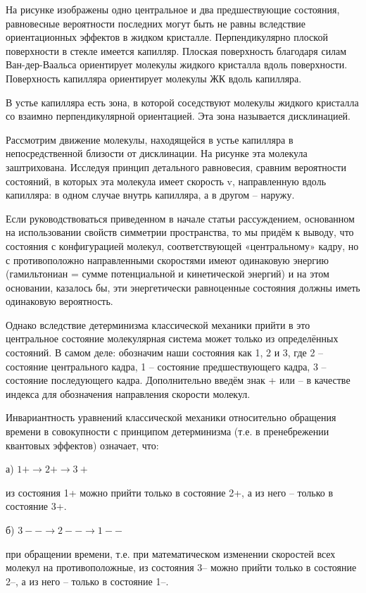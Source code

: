 \documentclass[11pt]{article}
\begin{document}
    На рисунке изображены одно центральное и два предшествующие состояния,
равновесные вероятности последних могут быть не равны вследствие
ориентационных эффектов в жидком кристалле. Перпендикулярно плоской
поверхности в стекле имеется капилляр. Плоская поверхность благодаря
силам Ван-дер-Ваальса ориентирует молекулы жидкого кристалла вдоль
поверхности. Поверхность капилляра ориентирует молекулы ЖК вдоль
капилляра.

    В устье капилляра есть зона, в которой соседствуют молекулы жидкого
кристалла со взаимно перпендикулярной ориентацией. Эта зона называется
дисклинацией.

Рассмотрим движение молекулы, находящейся в устье капилляра в
непосредственной близости от дисклинации. На рисунке эта молекула
заштрихована. Исследуя принцип детального равновесия, сравним
вероятности состояний, в которых эта молекула имеет скорость v,
направленную вдоль капилляра: в одном случае внутрь капилляра, а в
другом -- наружу.

Если руководствоваться приведенном в начале статьи рассуждением,
основанном на использовании свойств симметрии пространства, то мы придём
к выводу, что состояния с конфигурацией молекул, соответствующей
«центральному» кадру, но с противоположно направленными скоростями имеют
одинаковую энергию (гамильтониан = сумме потенциальной и кинетической
энергий) и на этом основании, казалось бы, эти энергетически равноценные
состояния должны иметь одинаковую вероятность.

Однако вследствие детерминизма классической механики прийти в это
центральное состояние молекулярная система может только из определённых
состояний. В самом деле: обозначим наши состояния как 1, 2 и 3, где 2 --
состояние центрального кадра, 1 -- состояние предшествующего кадра, 3 --
состояние последующего кадра. Дополнительно введём знак + или -- в
качестве индекса для обозначения направления скорости молекул.

Инвариантность уравнений классической механики относительно обращения
времени в совокупности с принципом детерминизма (т.е. в пренебрежении
квантовых эффектов) означает, что:

а) $1+ \rightarrow 2+ \rightarrow 3+$

из состояния 1+ можно прийти только в состояние 2+, а из него -- только
в состояние 3+.

б) $3-- \rightarrow 2-- \rightarrow 1--$

при обращении времени, т.е. при математическом изменении скоростей всех
молекул на противоположные, из состояния 3-- можно прийти только в
состояние 2--, а из него -- только в состояние 1--.
\end{document}
